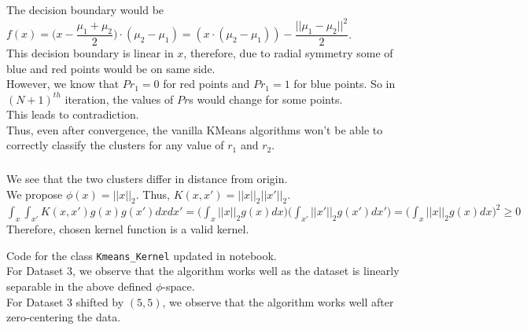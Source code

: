\documentclass[12pt, fleqn]{article}
\begin{document}
The decision boundary would be $f(x) = \bigg(x - \dfrac{\mu_1 + \mu_2}{2}\bigg) \cdot (\mu_2 - \mu_1) = (x \cdot (\mu_2 - \mu_1)) - \dfrac{||\mu_1 - \mu_2||^2}{2}$. \\
This decision boundary is linear in $x$, therefore, due to radial symmetry some of blue and red points would be on same side. \\
However, we know that $Pr_1 = 0$ for red points and $Pr_1 = 1$ for blue points. So in $(N+1)^{th}$ iteration, the values of $Pr$s would change for some points. \\

This leads to contradiction. \\
Thus, even after convergence, the vanilla KMeans algorithms won't be able to correctly classify the clusters for any value of $r_1$ and $r_2$.

\subsubsection{}
We see that the two clusters differ in distance from origin. \\
We propose $\phi(x) = ||x||_2$. Thus, $K(x, x') = ||x||_2 ||x'||_2$. \\
$\int_x \int_{x'} K(x, x') g(x) g(x') dx dx' = \bigg( \int_x ||x||_2 g(x) dx \bigg) \bigg( \int_{x'} ||x'||_2 g(x') dx' \bigg) = \bigg( \int_x ||x||_2 g(x) dx \bigg)^2 \ge 0$ \\
Therefore, chosen kernel function is a valid kernel.

\bigskip
\bigskip

Code for the class \verb!Kmeans_Kernel! updated in notebook. \\

For Dataset 3, we observe that the algorithm works well as the dataset is linearly separable in the above defined $\phi$-space. \\
For Dataset 3 shifted by $(5, 5)$, we observe that the algorithm works well after zero-centering the data. \\
\end{document}
